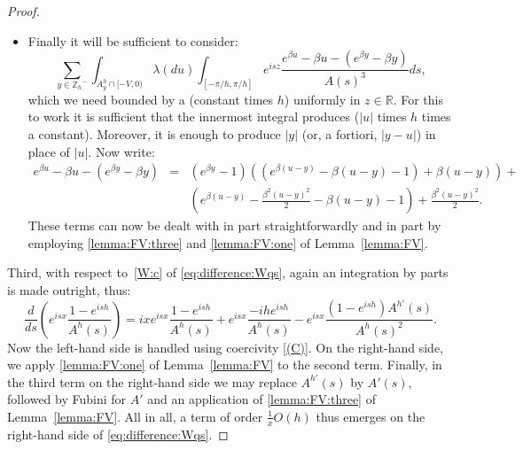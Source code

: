 \documentclass[pdftex,oneside,11pt,reqno]{amsart}
\theoremstyle{definition}
\theoremstyle{theorem}
\theoremstyle{remark}
\numberwithin{equation}{section}
\numberwithin{definition}{section}
\begin{document}
\begin{proof}
\begin{itemize}
\begin{equation}
\frac{1}{h}\left(e^{\beta h}-1\right)-\beta=\frac{1}{h}\left(\overbrace{e^{\beta h}-\frac{\beta^2 h^2}{2}-\beta h-1}^{{  \text{{(I)}}  \@bsphack
  \begingroup
    \@onelevel@sanitize\@currentlabelname
    \edef\@currentlabelname{      \expandafter\strip@period\@currentlabelname\relax.\relax\@@@    }    \protected@write\@auxout{}{      \string\newlabel{{FVI}}{        {{(I)}}        {\thepage}        {\@currentlabelname}        {\@currentHref}{}      }    }  \endgroup
  \@esphack
}}+\overbrace{\frac{\beta^2 h^2}{2}}^{{  \text{{(II)}}  \@bsphack
  \begingroup
    \@onelevel@sanitize\@currentlabelname
    \edef\@currentlabelname{      \expandafter\strip@period\@currentlabelname\relax.\relax\@@@    }    \protected@write\@auxout{}{      \string\newlabel{{FVII}}{        {{(II)}}        {\thepage}        {\@currentlabelname}        {\@currentHref}{}      }    }  \endgroup
  \@esphack
}}\right).
\end{equation}
By an expansion into a series, which converges absolutely and locally uniformly, and coercivity \ref{(C)}, it is clear that \ref{FVI} has the desired property, whereas \eqref{lemma:FV:one} of Lemma~\ref{lemma:FV} may be applied to \ref{FVII}. 
\item Finally it will be sufficient to consider: $$\sum_{y\in{\mathbb{Z}_h}^{-}}\int_{A_y^h\cap [-V,0)}{\lambda}(du)\int_{[-\pi/h,\pi/h]}e^{isz}\frac{e^{\beta u}-\beta u-(e^{\beta  y}-\beta y)}{A(s)^3}ds,$$ which we need bounded by a (constant times $h$) uniformly in $z\in {\mathbb R}$. For this to work it is sufficient that the innermost integral produces ($\vert u\vert$ times $h$ times a constant). Moreover, it is enough to produce $\vert y\vert$ (or, a fortiori, $\vert y-u\vert$) in place of $\vert u\vert$. Now write: 
\begin{eqnarray*}
e^{\beta u}-\beta u-(e^{\beta  y}-\beta y)&=&(e^{\beta y}-1)\left((e^{\beta (u-y)}-\beta(u-y)-1)+\beta(u-y)\right)+\\
&&\left(e^{\beta(u-y)}-\frac{\beta^2(u-y)^2}{2}-\beta(u-y)-1\right)+\frac{\beta^2(u-y)^2}{2}.
\end{eqnarray*}
These terms can now be dealt with in part straightforwardly and in part by employing \eqref{lemma:FV:three} and \eqref{lemma:FV:one} of Lemma~\ref{lemma:FV}.
\end{itemize}

Third, with respect to~\ref{W:c} of \eqref{eq:difference:Wqs}, again an integration by parts is made outright, thus: 
$$\frac{d}{ds}\left(e^{isx}\frac{1-e^{ish}}{A^h(s)}\right)=ixe^{isx}\frac{1-e^{ish}}{A^h(s)}+e^{isx}\frac{-ihe^{ish}}{A^h(s)}-e^{isx}\frac{(1-e^{ish})A^{h\prime}(s)}{A^h(s)^2}.$$ Now the left-hand side is handled using coercivity \ref{(C)}. On the right-hand side, we apply \eqref{lemma:FV:one} of Lemma~\ref{lemma:FV} to the second term. Finally, in the third term on the right-hand side we may replace $A^{h\prime}(s)$ by $A'(s)$, followed by Fubini for $A'$ and an application of \eqref{lemma:FV:three} of Lemma~\ref{lemma:FV}. All in all, a term of order $\frac{1}{x}O(h)$ thus emerges on the right-hand side of \eqref{eq:difference:Wqs}. 


\end{proof}
\end{document}

